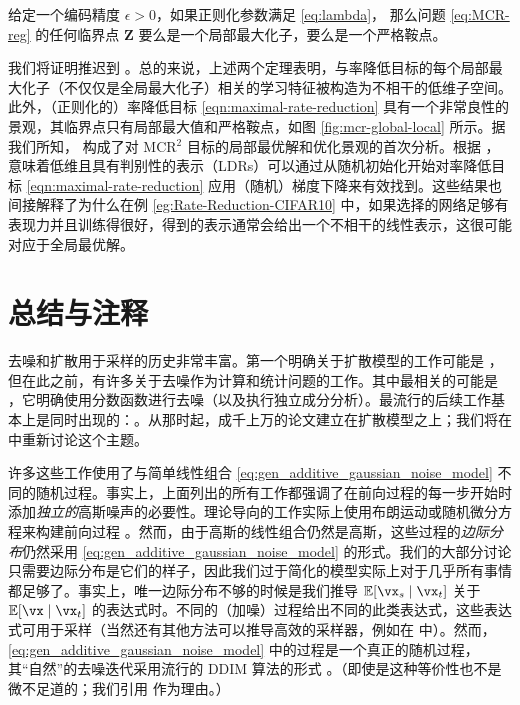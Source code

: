 \documentclass[../../book-main_zh.tex]{subfiles}
\begin{document}
\begin{theorem}[\bf 良性优化景观]\label{thm:mcr-benign-opt-landscape}
	给定一个编码精度 $\epsilon > 0$，如果正则化参数满足 \eqref{eq:lambda}，
	那么问题 \eqref{eq:MCR-reg} 的任何临界点 $\bm Z$ 要么是一个局部最大化子，要么是一个严格鞍点。
\end{theorem}
我们将证明推迟到 \cite{wang2024global}。总的来说，上述两个定理表明，与率降低目标的每个局部最大化子（不仅仅是全局最大化子）相关的学习特征被构造为不相干的低维子空间。此外，（正则化的）率降低目标 \eqref{eqn:maximal-rate-reduction} 具有一个非常良性的景观，其临界点只有局部最大值和严格鞍点，如图 \ref{fig:mcr-global-local} 所示。据我们所知， 构成了对 MCR$^2$ 目标的局部最优解和优化景观的首次分析。根据 \cite{sun2015nonconvex,lee2016gradient}， 意味着低维且具有判别性的表示（LDRs）可以通过从随机初始化开始对率降低目标 \eqref{eqn:maximal-rate-reduction} 应用（随机）梯度下降来有效找到。这些结果也间接解释了为什么在例 \ref{eg:Rate-Reduction-CIFAR10} 中，如果选择的网络足够有表现力并且训练得很好，得到的表示通常会给出一个不相干的线性表示，这很可能对应于全局最优解。




\section{总结与注释}

去噪和扩散用于采样的历史非常丰富。第一个明确关于扩散模型的工作可能是 \cite{Sohl-Dickstein2015}，但在此之前，有许多关于去噪作为计算和统计问题的工作。其中最相关的可能是 \cite{hyvarinen05a}，它明确使用分数函数进行去噪（以及执行独立成分分析）。最流行的后续工作基本上是同时出现的：\cite{ho2020denoising,song2019}。从那时起，成千上万的论文建立在扩散模型之上；我们将在  中重新讨论这个主题。

许多这些工作使用了与简单线性组合 \eqref{eq:gen_additive_gaussian_noise_model} 不同的随机过程。事实上，上面列出的所有工作都强调了在前向过程的每一步开始时添加\textit{独立的}高斯噪声的必要性。理论导向的工作实际上使用布朗运动或随机微分方程来构建前向过程 \cite{song2020score}。然而，由于高斯的线性组合仍然是高斯，这些过程的\textit{边际分布}仍然采用 \eqref{eq:gen_additive_gaussian_noise_model} 的形式。我们的大部分讨论只需要边际分布是它们的样子，因此我们过于简化的模型实际上对于几乎所有事情都足够了。事实上，唯一边际分布不够的时候是我们推导 \(\Ex[\vx_{s} \mid \vx_{t}]\) 关于 \(\Ex[\vx \mid \vx_{t}]\) 的表达式时。不同的（加噪）过程给出不同的此类表达式，这些表达式可用于采样（当然还有其他方法可以推导高效的采样器，例如在 \cite{song2020score} 中）。然而，\eqref{eq:gen_additive_gaussian_noise_model} 中的过程是一个真正的随机过程，其“自然”的去噪迭代采用流行的 DDIM 算法的形式 \cite{song2020denoising}。（即使是这种等价性也不是微不足道的；我们引用 \cite{de2025distributional} 作为理由。）
\end{document}
